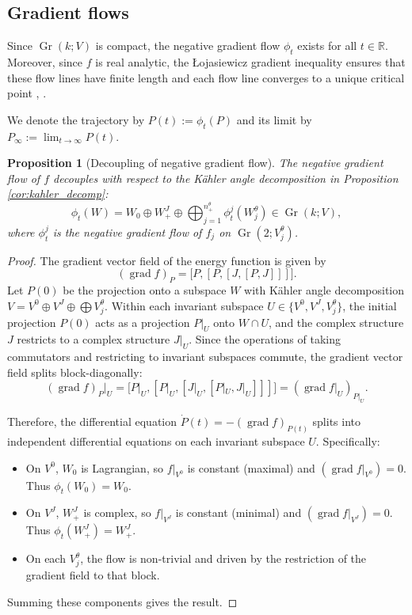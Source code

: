 \documentclass[12pt, final]{article}
\def\grad{\operatorname{grad}}
\def\Gr{\operatorname{Gr}}
\newtheorem{proposition}[theorem]{Proposition}
\begin{document}
\subsection{Gradient flows}
\label{subsec:gradient_flow}

Since $\Gr(k; V)$ is compact, the negative gradient flow $\phi_t$ exists for all $t \in \mathbb{R}$. Moreover, since $f$ is real analytic, the \L ojasiewicz gradient inequality ensures that these flow lines have finite length and each flow line converges to a unique critical point \cite{Lojasiewicz1}, \cite[Section IV.9]{Lojasiewicz2}.

We denote the trajectory by $P(t) := \phi_t(P)$ and its limit by $P_\infty := \lim_{t \to \infty} P(t)$.

\begin{proposition}[Decoupling of negative gradient flow]
\label{prop:decoupling}
The negative gradient flow of $f$ decouples with respect to the  K\"{a}hler angle decomposition in Proposition \ref{cor:kahler_decomp}:
\[ \phi_t(W) = W_0 \oplus W_+^J \oplus \bigoplus_{j = 1}^{n_+^\theta} \phi_t^j(W_j^\theta) \in \Gr(k; V), \]
where $\phi_t^j$ is the negative gradient flow of $f_j$ on $\Gr(2; V_j^\theta)$.
\end{proposition}
\begin{proof}
The gradient vector field of the energy function is given by
\[ (\grad f)_P = \big[ P, [P, [J, [P, J]]] \big]. \]
Let $P(0)$ be the projection onto a subspace $W$ with K\"{a}hler angle decomposition $V = V^0 \oplus V^J \oplus \bigoplus V_j^\theta$.
Within each invariant subspace $U \in \{V^0, V^J, V_j^\theta\}$, the initial projection $P(0)$ acts as a projection $P|_U$ onto $W \cap U$, and the complex structure $J$ restricts to a complex structure $J|_U$.
Since the operations of taking commutators and restricting to invariant subspaces commute, the gradient vector field splits block-diagonally:
\[ (\grad f)_P \big|_U = \big[ P|_U, [P|_U, [J|_U, [P|_U, J|_U]]] \big] = (\grad f|_{U})_{P|_U}. \]

Therefore, the differential equation $\dot{P}(t) = -(\grad f)_{P(t)}$ splits into independent differential equations on each invariant subspace $U$.
Specifically:
\begin{itemize}
    \item On $V^0$, $W_0$ is Lagrangian, so $f|_{V^0}$ is constant (maximal) and $(\grad f|_{V^0}) = 0$. Thus $\phi_t(W_0) = W_0$.
    \item On $V^J$, $W_+^J$ is complex, so $f|_{V^J}$ is constant (minimal) and $(\grad f|_{V^J}) = 0$. Thus $\phi_t(W_+^J) = W_+^J$.
    \item On each $V_j^\theta$, the flow is non-trivial and driven by the restriction of the gradient field to that block.
\end{itemize}
Summing these components gives the result.
\end{proof}
\end{document}
